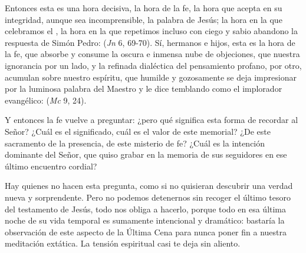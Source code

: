 \begin{body}
Entonces esta es una hora decisiva, la hora de la fe, la hora que acepta en su integridad, aunque sea incomprensible, la palabra de Jesús; la hora en la que celebramos el , la hora en la que repetimos incluso con ciego y sabio abandono la respuesta de Simón Pedro:  (\textit{Jn} 6, 69-70). Sí, hermanos e hijos, esta es la hora de la fe, que absorbe y consume la oscura e inmensa nube de objeciones, que nuestra ignorancia por un lado, y la refinada dialéctica del pensamiento profano, por otro, acumulan sobre nuestro espíritu, que humilde y gozosamente se deja impresionar por la luminosa palabra del Maestro y le dice temblando como el implorador evangélico:  (\textit{Mc} 9, 24). 

Y entonces la fe vuelve a preguntar: ¿pero qué significa esta forma de recordar al Señor? ¿Cuál es el significado, cuál es el valor de este memorial? ¿De este sacramento de la presencia, de este misterio de fe? ¿Cuál es la intención dominante del Señor, que quiso grabar en la memoria de sus seguidores en ese último encuentro cordial? 

Hay quienes no hacen esta pregunta, como si no quisieran descubrir una verdad nueva y sorprendente. Pero no podemos detenernos sin recoger el último tesoro del testamento de Jesús, todo nos obliga a hacerlo, porque todo en esa última noche de su vida temporal es sumamente intencional y dramático: bastaría la observación de este aspecto de la Última Cena para nunca poner fin a nuestra meditación extática. La tensión espiritual casi te deja sin aliento. 


\end{body}
